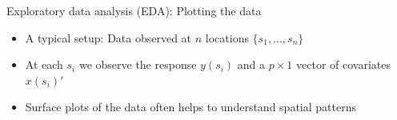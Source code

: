 \begin{frame}{Exploratory data analysis (EDA): Plotting the data}
	\begin{itemize}
		\item A typical setup: Data observed at $n$ locations $\{s_1,\ldots,s_n\}$
		\item At each $s_i$ we observe the response $y(s_i)$ and a $p\times 1$ vector of covariates $x(s_i)'$
		\item \alert{Surface plots} of the data often helps to understand spatial patterns
	\end{itemize}
	\vskip-7mm\begin{figure}

\end{figure}
\end{frame}
